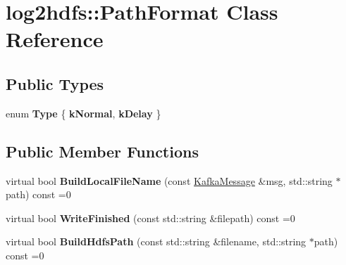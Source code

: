 \hypertarget{classlog2hdfs_1_1PathFormat}{}\section{log2hdfs\+:\+:Path\+Format Class Reference}
\label{classlog2hdfs_1_1PathFormat}
\subsection*{Public Types}
\begin{DoxyCompactItemize}
\item 
enum {\bfseries Type} \{ {\bfseries k\+Normal}, 
{\bfseries k\+Delay}
 \}\hypertarget{classlog2hdfs_1_1PathFormat_a681d8de0cabd971a218bc4597e29e12f}{}\label{classlog2hdfs_1_1PathFormat_a681d8de0cabd971a218bc4597e29e12f}

\end{DoxyCompactItemize}
\subsection*{Public Member Functions}
\begin{DoxyCompactItemize}
\item 
virtual bool {\bfseries Build\+Local\+File\+Name} (const \hyperlink{classlog2hdfs_1_1KafkaMessage}{Kafka\+Message} \&msg, std\+::string $\ast$path) const =0\hypertarget{classlog2hdfs_1_1PathFormat_ad3fa64a6e9319f90c71f8028b66b59f8}{}\label{classlog2hdfs_1_1PathFormat_ad3fa64a6e9319f90c71f8028b66b59f8}

\item 
virtual bool {\bfseries Write\+Finished} (const std\+::string \&filepath) const =0\hypertarget{classlog2hdfs_1_1PathFormat_ab8f27d327871a98808868f19407513b8}{}\label{classlog2hdfs_1_1PathFormat_ab8f27d327871a98808868f19407513b8}

\item 
virtual bool {\bfseries Build\+Hdfs\+Path} (const std\+::string \&filename, std\+::string $\ast$path) const =0\hypertarget{classlog2hdfs_1_1PathFormat_a75e5ace2e6950f862178b4b93e7a7649}{}\label{classlog2hdfs_1_1PathFormat_a75e5ace2e6950f862178b4b93e7a7649}

\end{DoxyCompactItemize}
